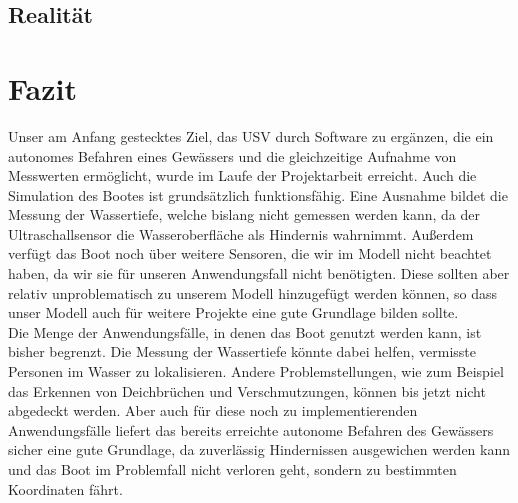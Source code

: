 \documentclass[11pt]{article}
\begin{document}
\subsection{Realität}


\section{Fazit} \label{fazit}
Unser am Anfang gestecktes Ziel, das USV durch Software zu ergänzen, die ein autonomes Befahren eines Gewässers und die gleichzeitige Aufnahme von Messwerten ermöglicht, wurde im Laufe der Projektarbeit erreicht. Auch die Simulation des Bootes ist grundsätzlich funktionsfähig. Eine Ausnahme bildet die Messung der Wassertiefe, welche bislang nicht gemessen werden kann, da der Ultraschallsensor die Wasseroberfläche als Hindernis wahrnimmt. Außerdem verfügt das Boot noch über weitere Sensoren, die wir im Modell nicht beachtet haben, da wir sie für unseren Anwendungsfall nicht benötigten. Diese sollten aber relativ unproblematisch zu unserem Modell hinzugefügt werden können, so dass unser Modell auch für weitere Projekte eine gute Grundlage bilden sollte.\\
Die Menge der Anwendungsfälle, in denen das Boot genutzt werden kann, ist bisher begrenzt. Die Messung der Wassertiefe könnte dabei helfen, vermisste Personen im Wasser zu lokalisieren. Andere Problemstellungen, wie zum Beispiel das Erkennen von Deichbrüchen und Verschmutzungen, können bis jetzt nicht abgedeckt werden. Aber auch für diese noch zu implementierenden Anwendungsfälle liefert das bereits erreichte autonome Befahren des Gewässers sicher eine gute Grundlage, da zuverlässig Hindernissen ausgewichen werden kann und das Boot im Problemfall nicht verloren geht, sondern zu bestimmten Koordinaten fährt.

{}

\end{document}
